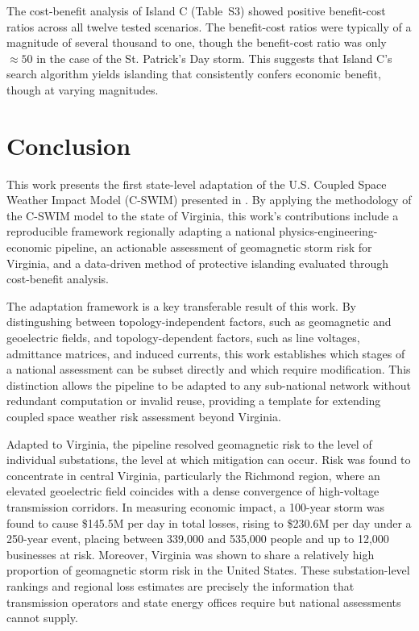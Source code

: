 \documentclass[draft]{agujournal2019}
\begin{document}
The cost-benefit analysis of Island C (Table~S3) showed positive benefit-cost ratios across all twelve tested scenarios. The benefit-cost ratios were typically of a magnitude of several thousand to one, though the benefit-cost ratio was only $\approx50$ in the case of the St. Patrick's Day storm. This suggests that Island C's search algorithm yields islanding that consistently confers economic benefit, though at varying magnitudes.

\section{Conclusion}

This work presents the first state-level adaptation of the U.S. Coupled Space Weather Impact Model (C-SWIM) presented in . By applying the methodology of the C-SWIM model to the state of Virginia, this work's contributions include a reproducible framework regionally adapting a national physics-engineering-economic pipeline, an actionable assessment of geomagnetic storm risk for Virginia, and a data-driven method of protective islanding evaluated through cost-benefit analysis.

The adaptation framework is a key transferable result of this work. By distingushing between topology-independent factors, such as geomagnetic and geoelectric fields, and topology-dependent factors, such as line voltages, admittance matrices, and induced currents, this work establishes which stages of a national assessment can be subset directly and which require modification. This distinction allows the pipeline to be adapted to any sub-national network without redundant computation or invalid reuse, providing a template for extending coupled space weather risk assessment beyond Virginia.

Adapted to Virginia, the pipeline resolved geomagnetic risk to the level of individual substations, the level at which mitigation can occur. Risk was found to concentrate in central Virginia, particularly the Richmond region, where an elevated geoelectric field coincides with a dense convergence of high-voltage transmission corridors. In measuring economic impact, a 100-year storm was found to cause \$145.5M per day in total losses, rising to \$230.6M per day under a 250-year event, placing between 339,000 and 535,000 people and up to 12,000 businesses at risk. Moreover, Virginia was shown to share a relatively high proportion of geomagnetic storm risk in the United States. These substation-level rankings and regional loss estimates are precisely the information that transmission operators and state energy offices require but national assessments cannot supply.
\end{document}
